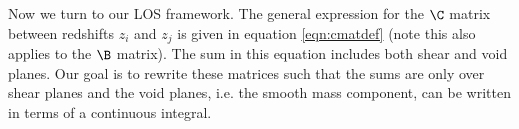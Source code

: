 Now we turn to our LOS framework. The general expression for the $\C$ matrix between redshifts $z_i$ and $z_j$ is given in equation \ref{eqn:cmatdef} (note this also applies to the $\B$ matrix). The sum in this equation includes both shear and void planes. Our goal is to rewrite these matrices such that the sums are only over shear planes and the void planes, i.e. the smooth mass component, can be written in terms of a continuous integral.  
  
  